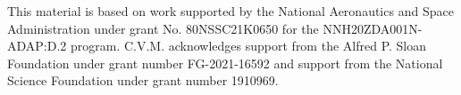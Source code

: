 \documentclass[twocolumn, linenumbers]{aastex631}
\begin{document}
\vspace{0.5cm}
This material is based on work supported by the National Aeronautics and Space Administration under grant No. 80NSSC21K0650 for the NNH20ZDA001N-ADAP:D.2 program. C.V.M. acknowledges support from the Alfred P. Sloan Foundation under grant number FG-2021-16592 and support from the National Science Foundation under grant number 1910969.
\vspace{0.5cm}



\end{document}
